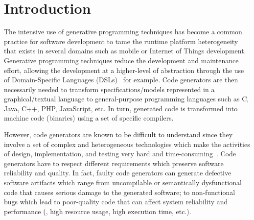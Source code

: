 \section{Introduction}

\enlargethispage{0.5cm}


The intensive use of generative programming techniques has become a common practice for software development to tame the runtime platform heterogeneity that exists in several domains such as mobile or Internet of Things development. Generative programming techniques reduce the development and maintenance effort, allowing the development at a higher-level of abstraction through the use of Domain-Specific Languages (DSLs)~\cite{brambilla2012model} for example. 
Code generators are then necessarily needed to transform specifications/models represented in a graphical/textual language to general-purpose programming languages such as C, Java, C++, PHP, JavaScript, etc. In turn, generated code is transformed into machine code (binaries) using a set of specific compilers.


However, code generators are known to be difficult to understand since they involve a set of complex and heterogeneous technologies which make the activities of design, implementation, and testing very hard and time-consuming~\cite{france2007model,guana2015developers}. Code generators have to respect different requirements which preserve software reliability and quality. In fact, faulty code generators can generate defective software artifacts which range from uncompilable or semantically dysfunctional code that causes serious damage to the generated software; to non-functional bugs which lead to poor-quality code that can affect system reliability and performance (\eg, high resource usage, high execution time, etc.). 

